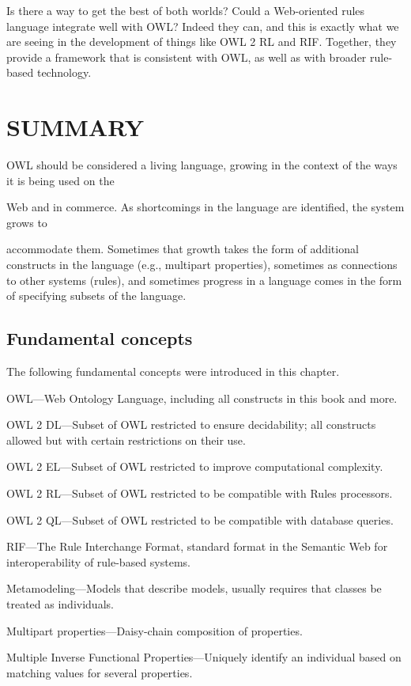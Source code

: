 Is there a way to get the best of both worlds? Could a Web-oriented
rules language integrate well with OWL? Indeed they can, and this is
exactly what we are seeing in the development of things like OWL 2 RL
and RIF. Together, they provide a framework that is consistent with OWL,
as well as with broader rule-based technology.

\section{SUMMARY}

OWL should be considered a living language, growing in the context of
the ways it is being used on the

Web and in commerce. As shortcomings in the language are identified, the
system grows to

accommodate them. Sometimes that growth takes the form of additional
constructs in the language (e.g., multipart properties), sometimes as
connections to other systems (rules), and sometimes progress in a
language comes in the form of specifying subsets of the language.

\subsection{Fundamental concepts}

The following fundamental concepts were introduced in this chapter.

OWL---Web Ontology Language, including all constructs in this book and
more.

OWL 2 DL---Subset of OWL restricted to ensure decidability; all
constructs allowed but with certain restrictions on their use.

OWL 2 EL---Subset of OWL restricted to improve computational complexity.

OWL 2 RL---Subset of OWL restricted to be compatible with Rules
processors.

OWL 2 QL---Subset of OWL restricted to be compatible with database
queries.

RIF---The Rule Interchange Format, standard format in the Semantic Web
for interoperability of rule-based systems.

Metamodeling---Models that describe models, usually requires that
classes be treated as individuals.

Multipart properties---Daisy-chain composition of properties.

Multiple Inverse Functional Properties---Uniquely identify an individual
based on matching values for several properties.
